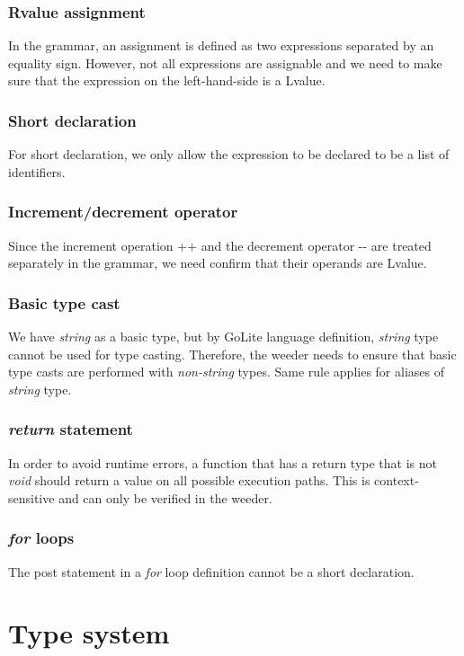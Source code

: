 \documentclass[a4paper]{article}
\begin{document}
\subsubsection{Rvalue assignment}
In the grammar, an assignment is defined as two expressions separated by an equality sign. However, not all expressions are assignable and we need to make sure that the expression on the left-hand-side is a Lvalue. 

\subsubsection{Short declaration}
For short declaration, we only allow the expression to be declared to be a list of identifiers.

\subsubsection{Increment/decrement operator}
Since the increment operation ++ and the decrement operator -{}- are treated separately in the grammar, we need confirm that their operands are Lvalue.

\subsubsection{Basic type cast}
We have \textit{string} as a basic type, but by GoLite language definition, \textit{string} type cannot be used for type casting. Therefore, the weeder needs to ensure that basic type casts are performed with \textit{non-string} types. Same rule applies for aliases of \textit{string} type.

\subsubsection{\textit{return} statement}
In order to avoid runtime errors, a function that has a return type that is not \textit{void} should return a value on all possible execution paths. This is context-sensitive and can only be verified in the weeder.

\subsubsection{\textit{for} loops}
The post statement in a \textit{for} loop definition cannot be a short declaration. 

\section{Type system}
\end{document}
